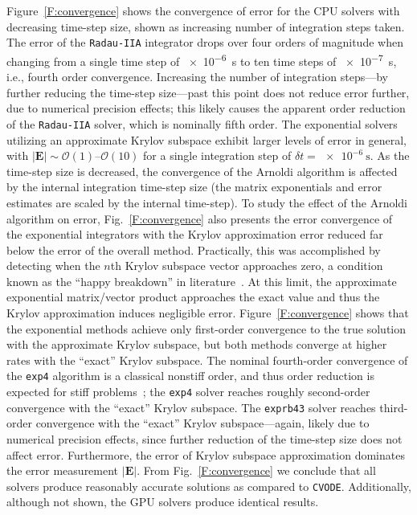 \documentclass[preprint,review,11pt]{elsarticle}
\begin{document}
Figure~\ref{F:convergence} shows the convergence of error for the CPU solvers with decreasing time-step size, shown as increasing number of integration steps taken.
The error of the \texttt{Radau-IIA} integrator drops over four orders of magnitude when changing from a single time step of \SI{e-6}{\second} to ten time steps of \SI{e-7}{\second}, i.e., fourth order convergence.
Increasing the number of integration steps---by further reducing the time-step size---past this point does not reduce error further, due to numerical precision effects; this likely causes the apparent order reduction of the \texttt{Radau-IIA} solver, which is nominally fifth order.
The exponential solvers utilizing an approximate Krylov subspace exhibit larger levels of error in general, with $\left\lvert\textbf{E}\right\rvert \sim \mathcal{O}(1)\text{--}\mathcal{O}(10)$ for a single integration step of $\delta t = \SI{e-6}{\second}$.
As the time-step size is decreased, the convergence of the Arnoldi algorithm is affected by the internal integration time-step size (the matrix exponentials and error estimates are scaled by the internal time-step).
To study the effect of the Arnoldi algorithm on error, Fig.~\ref{F:convergence} also presents the error convergence of the exponential integrators with the Krylov approximation error reduced far below the error of the overall method.
Practically, this was accomplished by detecting when the $n$th Krylov subspace vector approaches zero, a condition known as the ``happy breakdown'' in literature~\cite{datta2010numerical}.
At this limit, the approximate exponential matrix\slash vector product approaches the exact value and thus the Krylov approximation induces negligible error.
Figure~\ref{F:convergence} shows that the exponential methods achieve only first-order convergence to the true solution with the approximate Krylov subspace, but both methods converge at higher rates with the ``exact'' Krylov subspace.
The nominal fourth-order convergence of the \texttt{exp4} algorithm is a classical nonstiff order, and thus order reduction is expected for stiff problems~\cite{ANU:7701740,Bisetti:2012jw}; the \texttt{exp4} solver reaches roughly second-order convergence with the ``exact'' Krylov subspace.
The \texttt{exprb43} solver reaches third-order convergence with the ``exact'' Krylov subspace---again, likely due to numerical precision effects, since further reduction of the time-step size does not affect error.
Furthermore, the error of Krylov subspace approximation dominates the error measurement $\lvert\textbf{E}\rvert$.
From Fig.~\ref{F:convergence} we conclude that all solvers produce reasonably accurate solutions as compared to \texttt{CVODE}.
Additionally, although not shown, the GPU solvers produce identical results.
\end{document}
